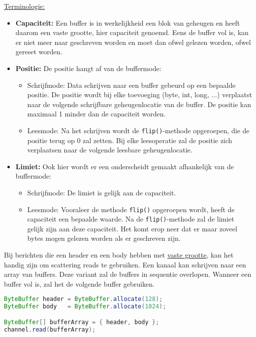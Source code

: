 \documentclass{report}
\begin{document}
\underline{Terminologie:}
\begin{itemize}
	\item[\info] \textbf{Capaciteit:} Een buffer is in werkelijkheid een blok van geheugen en heeft daarom een vaste grootte, hier capaciteit genoemd. Eens de buffer vol is, kan er niet meer naar geschreven worden en moet dan ofwel gelezen worden, ofwel gereset worden.
	\item[\info] \textbf{Positie:} De positie hangt af van de buffermode:
	\begin{itemize}
		\item Schrijfmode: Data schrijven naar een buffer gebeurd op een bepaalde positie. De positie wordt bij elke toevoeging (byte, int, long, ...) verplaatst naar de volgende schrijfbare geheugenlocatie van de buffer. De positie kan maximaal 1 minder dan de capaciteit worden.
		\item Leesmode: Na het schrijven wordt de \texttt{flip()}-methode opgeroepen, die de positie terug op 0 zal zetten. Bij elke leesoperatie zal de positie zich verplaatsen naar de volgende leesbare geheugenlocatie.
	\end{itemize}
	\item[\info] \textbf{Limiet:} Ook hier wordt er een onderscheidt gemaakt afhankelijk van de buffermode:
	\begin{itemize}
		\item Schrijfmode: De limiet is gelijk aan de capaciteit.
		\item Leesmode: Vooraleer de methode \texttt{flip()} opgeroepen wordt, heeft de capaciteit een bepaalde waarde. Na de \texttt{flip()}-methode zal de limiet gelijk zijn aan deze capaciteit. Het komt erop neer dat er maar zoveel bytes mogen gelezen worden als er geschreven zijn.
	\end{itemize}
\end{itemize}

Bij berichten die een header en een body hebben met \underline{vaste grootte}, kan het handig zijn om scattering reads te gebruiken. Een kanaal kan schrijven naar een array van buffers. Deze variant zal de buffers in sequentie overlopen. Wanneer een buffer vol is, zal het de volgende buffer gebruiken. 
\begin{lstlisting}[language=java]
ByteBuffer header = ByteBuffer.allocate(128);
ByteBuffer body   = ByteBuffer.allocate(1024);

ByteBuffer[] bufferArray = { header, body };
channel.read(bufferArray);
\end{lstlisting}
\end{document}
